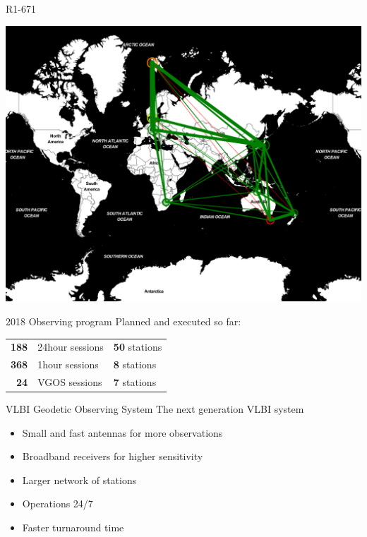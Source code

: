 \documentclass[14pt,table,t, c]{beamer}
\begin{document}
\begin{frame}{R1-671}
\begin{center}
	\includegraphics[width=0.9\linewidth]{figure/R1671}
\end{center}
\end{frame}

\begin{frame}{2018 Observing program}
\large{Planned and executed so far:}

\vspace*{1em}
\begin{tabularx}{\textwidth}{rXX}
    \textbf{188} & 24hour sessions &  \textbf{50} stations \\
    \textbf{368} & 1hour  sessions &   \textbf{8} stations \\
     \textbf{24} & VGOS   sessions &   \textbf{7} stations \\
\end{tabularx}

\end{frame}

\begin{frame}{VLBI Geodetic Observing System}
The next generation VLBI system

\begin{itemize}
  \item Small and fast antennas for more observations
  \item Broadband receivers for higher sensitivity
  \item Larger network of stations
  \item Operations 24/7
  \item Faster turnaround time 
\end{itemize}
\end{frame}
\end{document}
